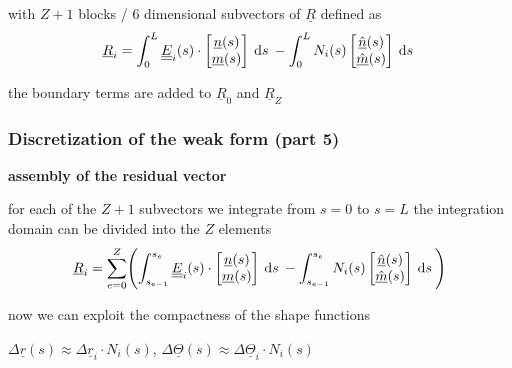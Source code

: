\begin{frame}
  with $Z+1$ blocks / $6$ dimensional subvectors of $\underline{R}$ defined as
  \begin{displaymath}
    \underline{R}_i =
    \int_0^L
      \doubleunderline{E}_i(s) \cdot
      \begin{bmatrix}
        \underline{n}(s) \\ \underline{m}(s)
      \end{bmatrix}
    \: \dif s \:
    - \int_0^L
      N_i(s)
      \begin{bmatrix}
        \underline{\hat{n}}(s) \\ \underline{\hat{m}}(s)
      \end{bmatrix}
    \: \dif s \:
  \end{displaymath}
  
  the boundary terms are added to $\underline{R}_0$ and $\underline{R}_Z$

\end{frame}


\begin{frame}
  \frametitle{Discretization of the weak form (part 5)}

  \textbf{assembly of the residual vector}

  for each of the $Z+1$ subvectors we integrate from $s=0$ to $s=L$ \newline
  the integration domain can be divided into the $Z$ elements
  \begin{displaymath}
    \underline{R}_i =
    \sum_{e=0}^{Z}
    \Biggl(
    \int_{s_{e-1}}^{s_e}
      \doubleunderline{E}_i(s) \cdot
      \begin{bmatrix}
        \underline{n}(s) \\ \underline{m}(s)
      \end{bmatrix}
    \: \dif s \:
    - \int_{s_{e-1}}^{s_e}
      N_i(s)
      \begin{bmatrix}
        \underline{\hat{n}}(s) \\ \underline{\hat{m}}(s)
      \end{bmatrix}
    \: \dif s \:
    \Biggr)
  \end{displaymath}

  now we can exploit the compactness of the shape functions
  
  \vspace{1em}
  $\Delta \underline{r}(s) \approx \Delta \underline{r}_i \cdot N_i(s)$, 
  $\Delta \underline{\Theta}(s) \approx \Delta \underline{\Theta}_i \cdot N_i(s)$
\end{frame}